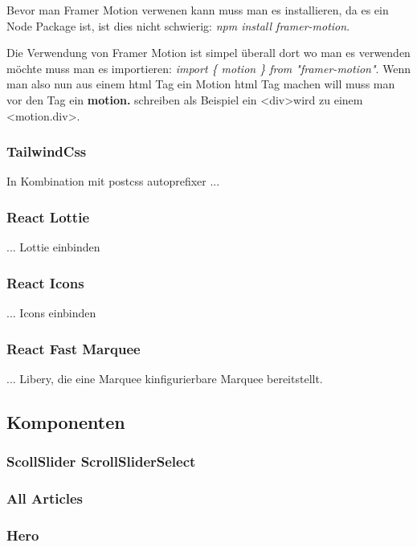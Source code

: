 Bevor man Framer Motion verwenen kann muss man es installieren, da es ein Node Package ist, ist dies nicht schwierig: \emph{npm install framer-motion}.

Die Verwendung von Framer Motion ist simpel überall dort wo man es verwenden möchte muss man es importieren: \emph{import \{ motion \} from "framer-motion"}.
Wenn man also nun aus einem html Tag ein Motion html Tag machen will muss man vor den Tag ein \textbf{motion.} schreiben als Beispiel ein \textless div\textgreater wird zu einem \textless motion.div\textgreater.   



\subsubsection*{TailwindCss}
In Kombination mit postcss autoprefixer ...

\subsubsection*{React Lottie}
... Lottie einbinden

\subsubsection*{React Icons}
... Icons einbinden

\subsubsection*{React Fast Marquee}
... Libery, die eine Marquee kinfigurierbare Marquee bereitstellt.

\subsection{Komponenten}

\subsubsection*{ScollSlider ScrollSliderSelect}

\subsubsection*{All Articles}

\subsubsection*{Hero}

